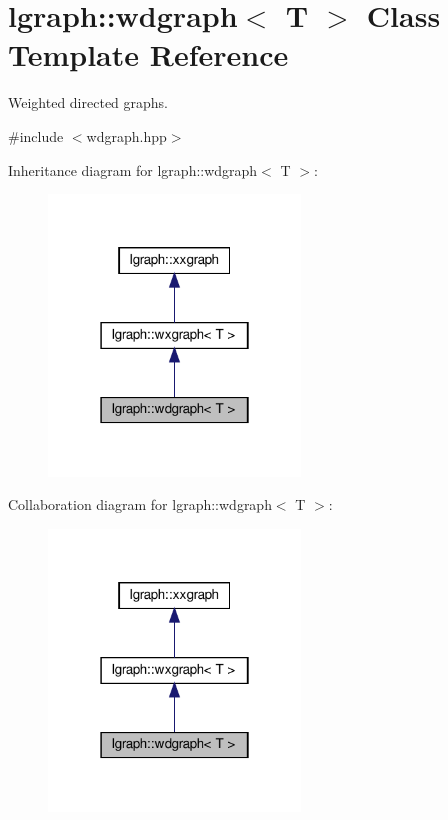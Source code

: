 \hypertarget{classlgraph_1_1wdgraph}{}\section{lgraph\+:\+:wdgraph$<$ T $>$ Class Template Reference}
\label{classlgraph_1_1wdgraph}


Weighted directed graphs.  




{\ttfamily \#include $<$wdgraph.\+hpp$>$}



Inheritance diagram for lgraph\+:\+:wdgraph$<$ T $>$\+:\nopagebreak
\begin{figure}[H]
\begin{center}
\leavevmode
\includegraphics[width=190pt]{classlgraph_1_1wdgraph__inherit__graph}
\end{center}
\end{figure}


Collaboration diagram for lgraph\+:\+:wdgraph$<$ T $>$\+:\nopagebreak
\begin{figure}[H]
\begin{center}
\leavevmode
\includegraphics[width=190pt]{classlgraph_1_1wdgraph__coll__graph}
\end{center}
\end{figure}
